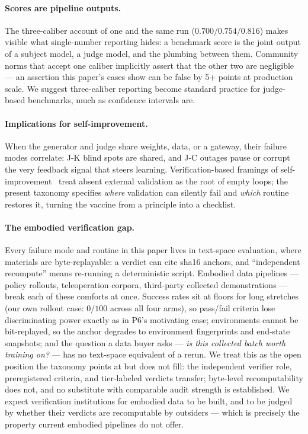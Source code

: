 \documentclass[11pt]{article}
\begin{document}
\paragraph{Scores are pipeline outputs.}
The three-caliber account of one and the same run ($0.700/0.754/0.816$)
makes visible what single-number reporting hides: a benchmark score is the
joint output of a subject model, a judge model, and the plumbing between
them. Community norms that accept one caliber implicitly assert that the
other two are negligible --- an assertion this paper's cases show can be
false by 5+ points at production scale. We suggest three-caliber reporting
become standard practice for judge-based benchmarks, much as confidence
intervals are.

\paragraph{Implications for self-improvement.}
When the generator and judge share weights, data, or a gateway, their
failure modes correlate: J-K blind spots are shared, and J-C outages pause
or corrupt the very feedback signal that steers learning. Verification-based
framings of self-improvement~\cite{emptyloop} treat absent external
validation as the root of empty loops; the present taxonomy specifies
\emph{where} validation can silently fail and \emph{which} routine restores
it, turning the vaccine from a principle into a checklist.

\paragraph{The embodied verification gap.}
Every failure mode and routine in this paper lives in text-space evaluation,
where materials are byte-replayable: a verdict can cite sha16 anchors, and
``independent recompute'' means re-running a deterministic script. Embodied
data pipelines --- policy rollouts, teleoperation corpora, third-party
collected demonstrations --- break each of these comforts at once. Success
rates sit at floors for long stretches (our own rollout case: $0/100$ across
all four arms), so pass/fail criteria lose discriminating power exactly as
in P6's motivating case; environments cannot be bit-replayed, so the anchor
degrades to environment fingerprints and end-state snapshots; and the
question a data buyer asks --- \emph{is this collected batch worth training
on?} --- has no text-space equivalent of a rerun. We treat this as the
open position the taxonomy points at but does not fill: the independent
verifier role, preregistered criteria, and tier-labeled verdicts transfer;
byte-level recomputability does not, and no substitute with comparable
audit strength is established. We expect verification institutions for
embodied data to be built, and to be judged by whether their verdicts are
recomputable by outsiders --- which is precisely the property current
embodied pipelines do not offer.
\end{document}
